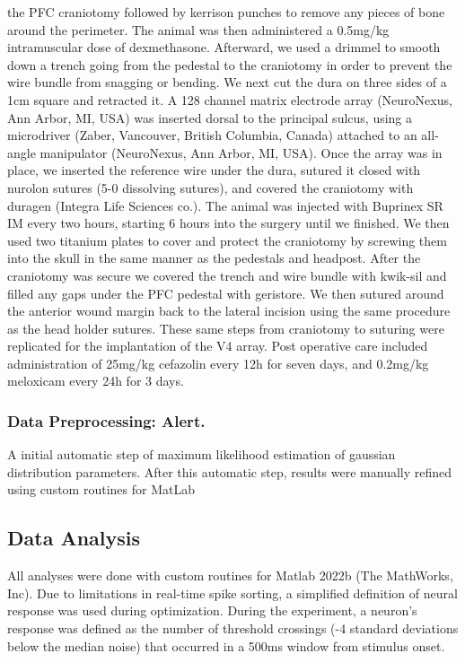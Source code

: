 the PFC craniotomy followed by kerrison punches to remove any pieces of bone around the perimeter. The animal was then administered a 0.5mg/kg intramuscular dose of dexmethasone. Afterward, we used a drimmel to smooth down a trench going from the pedestal to the craniotomy in order to prevent the wire bundle from snagging or bending. We next cut the dura on three sides of a 1cm square and retracted it. A 128 channel matrix electrode array (NeuroNexus, Ann Arbor, MI, USA) was inserted dorsal to the principal sulcus, using a microdriver (Zaber, Vancouver, British Columbia, Canada) attached to an all-angle manipulator (NeuroNexus, Ann Arbor, MI, USA). Once the array was in place, we inserted the reference wire under the dura, sutured it closed with nurolon sutures (5-0 dissolving sutures), and covered the craniotomy with duragen (Integra Life Sciences co.). The animal was injected with Buprinex SR IM every two hours, starting 6 hours into the surgery until we finished. We then used two titanium plates to cover and protect the craniotomy by screwing them into the skull in the same manner as the pedestals and headpost. After the craniotomy was secure we covered the trench and wire bundle with kwik-sil and filled any gaps under the PFC pedestal with geristore. We then sutured around the anterior wound margin back to the lateral incision using the same procedure as the head holder sutures. These same steps from craniotomy to suturing were replicated for the implantation of the V4 array. Post operative care included administration of 25mg/kg cefazolin every 12h for seven days, and 0.2mg/kg meloxicam every 24h for 3 days.

\subsubsection*{Data Preprocessing: Alert.}
A initial automatic step of maximum likelihood estimation of gaussian distribution parameters. After this automatic step, results were manually refined using custom routines for MatLab \parencite{Kelly2007}


\subsection{Data Analysis}
All analyses were done with custom routines for Matlab 2022b (The MathWorks, Inc). Due to limitations in real-time spike sorting, a simplified definition of neural response was used during optimization. During the experiment, a neuron's response was defined as the number of threshold crossings (-4 standard deviations below the median noise) that occurred in a 500ms window from stimulus onset. 


